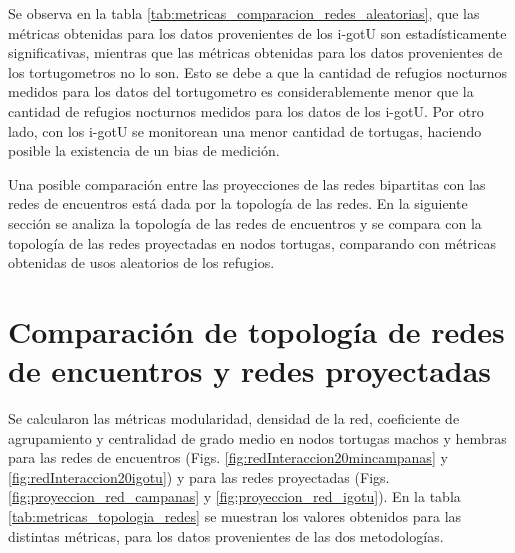 Se observa en la tabla \ref{tab:metricas_comparacion_redes_aleatorias}, que las métricas obtenidas para los datos provenientes de los i-gotU son estadísticamente significativas, mientras que las métricas obtenidas para los datos provenientes de los tortugometros no lo son. Esto se debe a que la cantidad de refugios nocturnos medidos para los datos del tortugometro es considerablemente menor que la cantidad de refugios nocturnos medidos para los datos de los i-gotU. Por otro lado, con los i-gotU se monitorean una menor cantidad de tortugas, haciendo posible la existencia de un bias de medición.
 
Una posible comparación entre las proyecciones de las redes bipartitas con las redes de encuentros está dada por la topología de las redes.  En la siguiente sección se analiza la topología de las redes de encuentros y se compara con la topología de las redes proyectadas en nodos tortugas, comparando con métricas obtenidas de usos aleatorios de los refugios.
\section{Comparación de topología de redes de encuentros y redes proyectadas}
Se calcularon las métricas modularidad, densidad de la red, coeficiente de agrupamiento y centralidad de grado medio en nodos tortugas machos y hembras para las redes de encuentros (Figs. \ref{fig:redInteraccion20mincampanas} y \ref{fig:redInteraccion20igotu}) y para las redes proyectadas (Figs. \ref{fig:proyeccion_red_campanas} y \ref{fig:proyeccion_red_igotu}). En la tabla \ref{tab:metricas_topologia_redes}   se muestran los valores obtenidos para las distintas métricas, para los datos provenientes de las dos metodologías.
 
 
 
